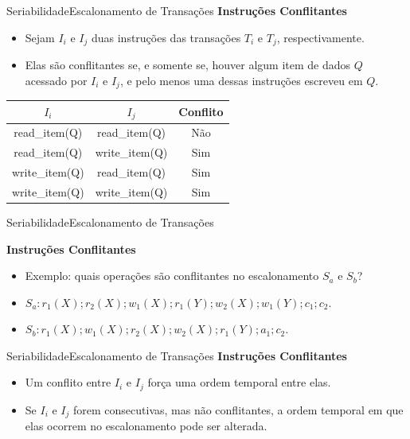 \documentclass[t]{beamer}
\begin{document}

\begin{ftst}{Seriabilidade}{Escalonamento de Transações}
\textbf{Instruções Conflitantes}
\vone
\begin{itemize}
    \item Sejam $I_i$ e $I_j$ duas instruções das transações $T_i$ e $T_j$, respectivamente.
    \item Elas são conflitantes se, e somente se, houver algum item de dados $Q$ acessado por $I_i$ e $I_j$, e pelo menos uma dessas instruções escreveu em $Q$.
\end{itemize}

\begin{table}[]
\centering
\begin{tabular}{|c|c|c|}
\hline
\textbf{$I_i$} & \textbf{$I_j$} & \textbf{Conflito} \\ \hline
read\_item(Q)  & read\_item(Q)  & Não               \\ \hline
read\_item(Q)  & write\_item(Q) & Sim               \\ \hline
write\_item(Q) & read\_item(Q)  & Sim               \\ \hline
write\_item(Q) & write\_item(Q) & Sim               \\ \hline
\end{tabular}
\end{table}

\end{ftst}


\begin{ftst}{Seriabilidade}{Escalonamento de Transações}

\textbf{Instruções Conflitantes}
\vone
\begin{itemize}
    \item Exemplo: quais operações são conflitantes no escalonamento $S_a$ e $S_b$?
    \vone
    \item $S_a: r_1(X); r_2(X); w_1(X); r_1(Y); w_2(X); w_1(Y); c_1; c_2$.
    \vone
    \item $S_b: r_1(X); w_1(X); r_2(X); w_2(X); r_1(Y); a_1; c_2$.

\end{itemize}


\end{ftst}


\begin{ftst}{Seriabilidade}{Escalonamento de Transações}
\textbf{Instruções Conflitantes}
\vone
\begin{itemize}
    \item Um conflito entre $I_i$ e $I_j$ força uma ordem temporal entre elas.
    \item Se $I_i$ e $I_j$ forem consecutivas, mas não conflitantes, a ordem temporal em que elas ocorrem no escalonamento pode ser alterada.

\end{itemize}

\end{ftst}
\end{document}
